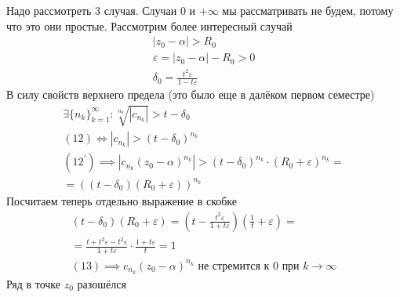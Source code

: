 \documentclass[main]{subfiles}
\begin{document}
\begin{longProof}
    Надо рассмотреть 3 случая. Случаи $0$ и $+\infty$ мы рассматривать не будем, потому что это они простые. Рассмотрим
    более интересный случай
    \begin{gather*}
        |z_0 - \alpha| > R_0 \tag{10} \\
        \varepsilon = |z_0 - \alpha| - R_0 > 0 \\
        \delta_0 = \frac{t^2 \varepsilon}{1-t\varepsilon} \tag{11}
    \end{gather*}
    В силу свойств верхнего предела (это было еще в далёком первом семестре)
    \begin{gather*}
        \exists \{ n_k \}^\infty_{k=1} : \sqrt[n_k]{|c_{n_k}|} > t - \delta_0 \tag{12} \\
        (12) \Leftrightarrow |c_{n_k}| > (t-\delta_0)^{n_k} \tag{12\prime} \\
        (12^\prime) \implies |c_{n_k} (z_0-\alpha)^{n_k} | > (t-\delta_0)^{n_k} \cdot (R_0 + \varepsilon)^{n_k} = \\
       = ((t-\delta_0)(R_0 + \varepsilon))^{n_k}
    \end{gather*}
    Посчитаем теперь отдельно выражение в скобке
    \begin{multline*}
        (t-\delta_0)(R_0+ \varepsilon) =  \left (t- \frac{t^2\varepsilon}{1+t\varepsilon}\right ) \left (\frac{1}{t} + \varepsilon  \right ) = \\
        = \frac{t+t^2\varepsilon-t^2\varepsilon}{1+t\varepsilon} \cdot \frac{1 + t \varepsilon}{t} = 1\\
        (13) \implies c_{n_k} (z_0 - \alpha)^{n_k} \text{ не стремится к 0 при } k \to \infty
    \end{multline*}
    Ряд в точке $z_0$ разошёлся


\end{longProof}
\end{document}
